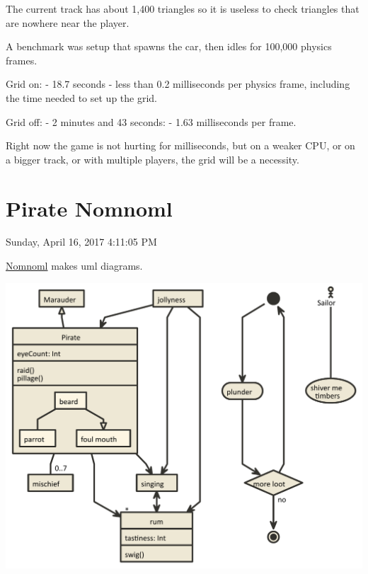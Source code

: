 \documentclass[]{book}
\begin{document}
The current track has about 1,400 triangles so it is useless to check
triangles that are nowhere near the player.

A benchmark was setup that spawns the car, then idles for 100,000
physics frames.

Grid on: - 18.7 seconds - less than 0.2 milliseconds per physics frame,
including the time needed to set up the grid.

Grid off: - 2 minutes and 43 seconds: - 1.63 milliseconds per frame.

Right now the game is not hurting for milliseconds, but on a weaker CPU,
or on a bigger track, or with multiple players, the grid will be a
necessity.

\chapter{Pirate Nomnoml}\label{pirate-nomnoml}

 Sunday, April 16, 2017 4:11:05 PM

\href{http://nomnoml.com}{Nomnoml} makes uml diagrams.

\includegraphics{Image/Pirate.nomnoml.pdf}


\end{document}
